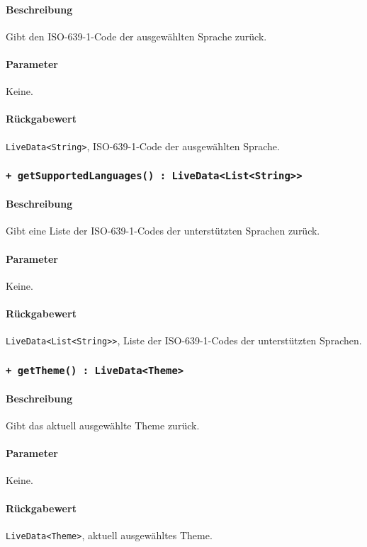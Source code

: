 \paragraph*{Beschreibung}
Gibt den ISO-639-1-Code der ausgewählten Sprache zurück.
\paragraph*{Parameter}
Keine.
\paragraph*{Rückgabewert}
\texttt{LiveData<String>}, ISO-639-1-Code der ausgewählten Sprache.

\subsubsection*{\texttt{+ getSupportedLanguages() : LiveData<List<String>>}}\label{App_Settings_ISettingsModel_getSupportedLanguages}%
\paragraph*{Beschreibung}
Gibt eine Liste der ISO-639-1-Codes der unterstützten Sprachen zurück.
\paragraph*{Parameter}
Keine.
\paragraph*{Rückgabewert}
\texttt{LiveData<List<String>>}, Liste der ISO-639-1-Codes der unterstützten Sprachen.

\subsubsection*{\texttt{+ getTheme() : LiveData<Theme>}}\label{App_Settings_ISettingsModel_getTheme}%
\paragraph*{Beschreibung}
Gibt das aktuell ausgewählte Theme zurück.
\paragraph*{Parameter}
Keine.
\paragraph*{Rückgabewert}
\texttt{LiveData<Theme>}, aktuell ausgewähltes Theme.

